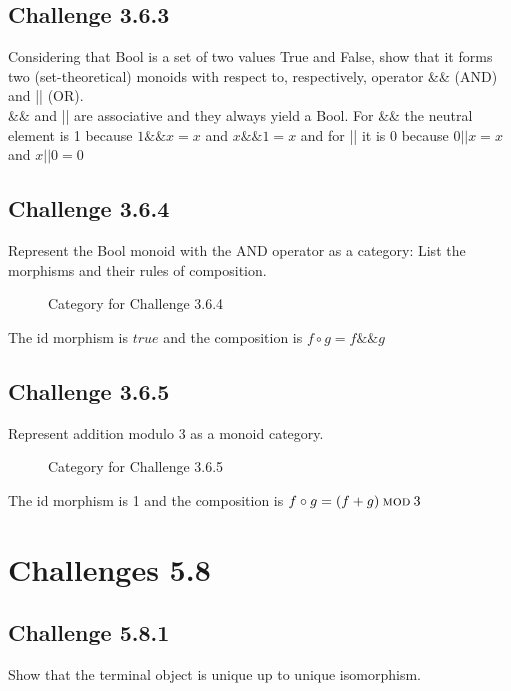 \documentclass[11pt]{article}
\begin{document}
    \subsection*{Challenge 3.6.3} Considering that Bool is a set of two values True and False, show
    that it forms two (set-theoretical) monoids with respect to, respectively,
    operator \&\& (AND) and || (OR). \\
    \&\& and || are associative and they always yield a Bool. For \&\& the neutral element is 1 because $1 \&\& x = x$ and $x \&\& 1 = x$ and for || it is 0 because $0 || x = x$ and $x || 0 = 0$

    \subsection*{Challenge 3.6.4}
    Represent the Bool monoid with the AND operator as a category:
    List the morphisms and their rules of composition.\\
    \begin{figure*}
        \centering
        \caption{Category for Challenge 3.6.4}
    \end{figure*}
    The id morphism is $true$ and the composition is $f \circ g = f \&\& g$

    \subsection*{Challenge 3.6.5}
    Represent addition modulo 3 as a monoid category. \\
    \begin{figure*}
        \centering
        \caption{Category for Challenge 3.6.5}
    \end{figure*}
    The id morphism is 1 and the composition is $f \circ g = (f + g)\:\textsc{mod}\: 3$

    \section*{Challenges 5.8}
    \subsection*{Challenge 5.8.1}
    Show that the terminal object is unique up to unique isomorphism.\\

    
\end{document}
